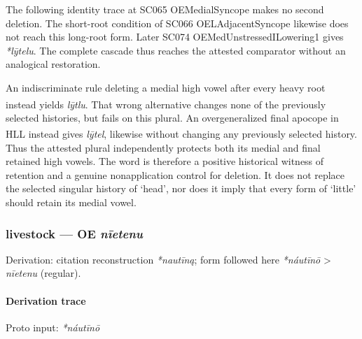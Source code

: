 \documentclass[
  british,
  a4paper,
]{article}
\newcounter{none} %
\providecommand{\Pred}[1]{\textsuperscript{\dag}\emph{#1}}
\begin{document}
The following identity trace at SC065 OEMedialSyncope makes no second
deletion. The short-root condition of SC066 OELAdjacentSyncope likewise
does not reach this long-root form. Later SC074
OEMedUnstressedILowering1 gives \emph{*lȳtelu}. The complete cascade
thus reaches the attested comparator without an analogical restoration.

An indiscriminate rule deleting a medial high vowel after every heavy
root instead yields \Pred{lȳtlu}. That wrong alternative changes none of
the previously selected histories, but fails on this plural. An
overgeneralized final apocope in HLL instead gives \Pred{lȳtel},
likewise without changing any previously selected history. Thus the
attested plural independently protects both its medial and final
retained high vowels. The word is therefore a positive historical
witness of retention and a genuine nonapplication control for deletion.
It does not replace the selected singular history of `head', nor does it
imply that every form of `little' should retain its medial vowel.

\subsubsection{\texorpdfstring{livestock --- OE
\emph{nīetenu}}{livestock --- OE nīetenu}}\label{livestock-oe-nux12betenu}

Derivation: citation reconstruction \emph{*nautīną}; form followed here
\emph{*náutīnō} \textgreater{} \emph{nīetenu} (regular).

\paragraph{Derivation trace}\label{derivation-trace-57}

Proto input: \emph{*náutīnō}

\begingroup
\setlength{\fboxsep}{6pt}
\end{document}
